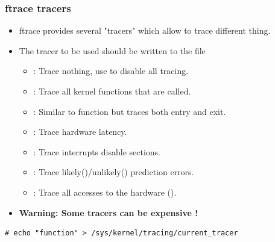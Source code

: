 \begin{frame}[fragile]
  \frametitle{ftrace tracers}
  \begin{itemize}
    \item ftrace provides several "tracers" which allow to trace different thing.
    \item The tracer to be used should be written to the  file
    \begin{itemize}
      \item {}: Trace nothing, use to disable all tracing.
      \item {}: Trace all kernel functions that are called.
      \item {}: Similar to {function} but traces both entry and exit.
      \item {}: Trace hardware latency.
      \item {}: Trace interrupts disable sections.
      \item {}: Trace likely()/unlikely() prediction errors.
      \item {}: Trace all accesses to the hardware ().
    \end{itemize}
    \item \textbf{Warning: Some tracers can be expensive !}
  \end{itemize}
  \begin{block}{}
    \begin{verbatim}
# echo "function" > /sys/kernel/tracing/current_tracer
    \end{verbatim}
  \end{block}
\end{frame}


